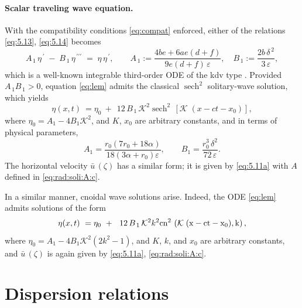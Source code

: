 \documentclass[alpha-refs, 12pt]{wiley-article}
\DeclareMathOperator{\sech}{sech}
\newcommand{\eps}{\varepsilon}
\begin{document}
\paragraph{Scalar traveling wave equation.} With the compatibility conditions \eqref{eq:compat} enforced, either of the relations \eqref{eq:5.13}, \eqref{eq:5.14} becomes
\begin{equation}
  A_{\,1}\,\eta^{\,\prime}
  \;-\;
  B_{\,1}\,\eta^{\,\prime\prime\prime}
  \;=\;
  \eta\,\eta^{\,\prime},
  \qquad
  A_{\,1}:=\frac{4be+6ae(d+f)}{9e(d+f)\,\eps},
  \quad
  B_{\,1}:=\frac{2b\,\delta^{\,2}}{3\,\eps},
  \label{eq:lem}
\end{equation}
which is a well-known integrable third-order ODE of the \acrshort{kdv} type \citep{Newell1977}. Provided $A_{\,1}B_{\,1}>0$, equation \eqref{eq:lem} admits the classical $\sech^{2}$ solitary-wave solution, which yields
\begin{equation}\label{eq:cyl:sol:sech2}
  \eta(x,t)\ =\eta_0~ + ~\ 12\,B_{\,1}\,\mathcal{K}^2
  \sech^{2}\,\left[\mathcal{K}\;(x-ct-x_0)\right],
\end{equation}
where $\eta_0=A_1-4B_1\mathcal{K}^2$, and $K$, $x_0$ are arbitrary constants, and in terms of physical parameters,
\[
  A_1 = \dfrac{r_0\left(7r_0 + 18\alpha\right)}{18\left(3\alpha + r_0\right)\eps},\qquad
  B_1 = \dfrac{r_0^3\,\delta^2}{72\,\eps}.
\]
The horizontal velocity $\bar{u}\,(\zeta)$ has a similar form; it is given by \eqref{eq:5.11a} with $A$ defined in \eqref{eq:rad:soli:A:c}.

In a similar manner, cnoidal wave solutions arise. Indeed, the ODE \eqref{eq:lem} admits solutions of the form
\begin{equation}\label{eq:cyl:sol:cn2}
  \eta(x,t)\ =\eta_0~ + ~\ 12\,B_{\,1}\,\mathcal{K}^2 k^2
  \rm{cn}^{2}\,\left(\mathcal{K}\;(x-ct-x_0), k\right),
\end{equation}
where $\eta_0=A_1 - 4B_1\mathcal{K}^2 (2k^2-1)$, and $K$, $k$, and $x_0$ are arbitrary constants, and $\bar{u}\,(\zeta)$ is again given by \eqref{eq:5.11a}, \eqref{eq:rad:soli:A:c}.



\section{Dispersion relations}\label{sec:dispersion}
\end{document}
